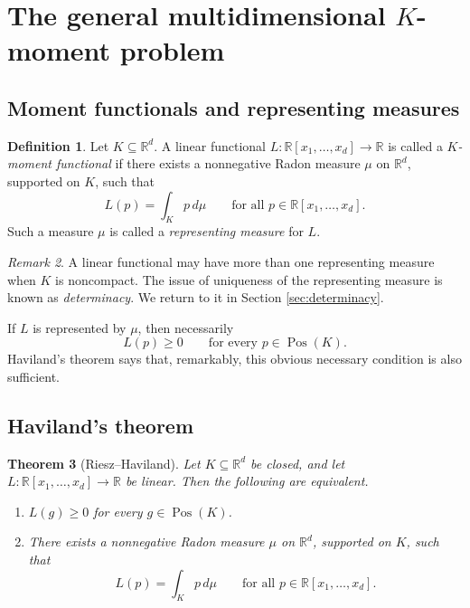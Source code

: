 \documentclass[11pt]{amsart}
\numberwithin{equation}{section}
\newtheorem{theorem}{Theorem}[section]
\theoremstyle{definition}
\newtheorem{definition}[theorem]{Definition}
\theoremstyle{remark}
\newtheorem{remark}[theorem]{Remark}
\newcommand{\R}{\mathbb{R}}
\newcommand{\Rxd}{\R[x_1,\dots,x_d]}
\newcommand{\Pos}{\operatorname{Pos}}
\newcommand{\1}{\mathbf{1}}
\begin{document}
\section{The general multidimensional \(K\)-moment problem}\label{sec:generalK}

\subsection{Moment functionals and representing measures}

\begin{definition}
Let \(K\subseteq\R^d\). A linear functional \(L:\Rxd\to\R\) is called a \emph{$K$-moment functional} if there exists a nonnegative Radon measure \(\mu\) on \(\R^d\), supported on \(K\), such that
\[
L(p)=\int_K p\,d\mu \qquad \text{for all } p\in\Rxd.
\]
Such a measure \(\mu\) is called a \emph{representing measure} for \(L\).
\end{definition}

\begin{remark}
A linear functional may have more than one representing measure when \(K\) is noncompact. The issue of uniqueness of the representing measure is known as \emph{determinacy}. We return to it in Section \ref{sec:determinacy}.
\end{remark}

If \(L\) is represented by \(\mu\), then necessarily
\[
L(p)\ge 0 \qquad \text{for every } p\in \Pos(K).
\]
Haviland's theorem says that, remarkably, this obvious necessary condition is also sufficient.

\subsection{Haviland's theorem}

\begin{theorem}[Riesz--Haviland]\label{thm:rieszhaviland}
Let \(K\subseteq\R^d\) be closed, and let \(L:\Rxd\to\R\) be linear. Then the following are equivalent.
\begin{enumerate}[label=\textup{(\roman*)}, leftmargin=2em]
\item \(L(g)\ge 0\) for every \(g\in\Pos(K)\).
\item There exists a nonnegative Radon measure \(\mu\) on \(\R^d\), supported on \(K\), such that
\[
L(p)=\int_K p\,d\mu \qquad \text{for all } p\in\Rxd.
\]
\end{enumerate}
\end{theorem}
\end{document}
